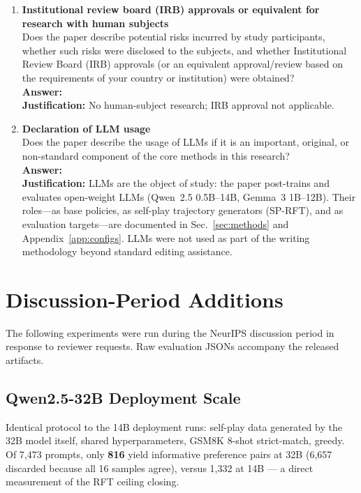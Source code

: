 \documentclass{article}
\newcommand{\sprft}{SP-RFT}
\begin{document}
\begin{enumerate}
\item {\bf Institutional review board (IRB) approvals or equivalent for research with human subjects}\\
Does the paper describe potential risks incurred by study participants, whether such risks were disclosed to the subjects, and whether Institutional Review Board (IRB) approvals (or an equivalent approval/review based on the requirements of your country or institution) were obtained?\\
\textbf{Answer:} \answerNA{}\\
\textbf{Justification:} No human-subject research; IRB approval not applicable.

\item {\bf Declaration of LLM usage}\\
Does the paper describe the usage of LLMs if it is an important, original, or non-standard component of the core methods in this research?\\
\textbf{Answer:} \answerYes{}\\
\textbf{Justification:} LLMs are the object of study: the paper post-trains and evaluates open-weight LLMs (Qwen~2.5 0.5B--14B, Gemma~3 1B--12B). Their roles---as base policies, as self-play trajectory generators (\sprft{}), and as evaluation targets---are documented in Sec.~\ref{sec:methods} and Appendix~\ref{app:configs}. LLMs were not used as part of the writing methodology beyond standard editing assistance.

\end{enumerate}

\section{Discussion-Period Additions}
\label{app:discussion_additions}

The following experiments were run during the NeurIPS discussion period in response to reviewer requests. Raw evaluation JSONs accompany the released artifacts.

\subsection{Qwen2.5-32B Deployment Scale}
\label{app:qwen32b}

Identical protocol to the 14B deployment runs: self-play data generated by the 32B model itself, shared hyperparameters, GSM8K 8-shot strict-match, greedy. Of 7,473 prompts, only \textbf{816} yield informative preference pairs at 32B (6,657 discarded because all 16 samples agree), versus 1,332 at 14B --- a direct measurement of the RFT ceiling closing.
\end{document}
